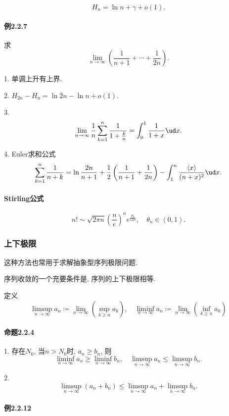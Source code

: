 $$
H_{n}=\ln n+\gamma+o(1).
$$


\paragraph{例2.2.7}

求
$$
\lim_{n\to\infty}\left(\frac{1}{n+1}+\cdots+\frac{1}{2n}\right).
$$

1. 单调上升有上界.

2. $H_{2n}-H_{n}=\ln2n-\ln n+o(1)$.

3. 
$$
\lim_{n\to\infty}\frac{1}{n}\sum_{k=1}^{n}\frac{1}{1+\frac{k}{n}}=\int_{0}^{1}\frac{1}{1+x}\ud x.
$$

4. Euler求和公式
$$
\sum_{k=1}^{n}\frac{1}{n+k}=\ln\frac{2n}{n+1}+\frac{1}{2}\left(\frac{1}{n+1}+\frac{1}{2n}\right)-\int_{1}^{n}\frac{\left\langle x\right\rangle }{(n+x)^{2}}\ud x.
$$


\paragraph{Stirling公式}

$$
n!\sim\sqrt{2\pi n}\left(\frac{n}{e}\right)^{n}e^{\frac{\theta_{n}}{12n}},\quad\theta_{n}\in\left(0,1\right).
$$


\subsubsection{上下极限}

这种方法也常用于求解抽象型序列极限问题. 

序列收敛的一个充要条件是, 序列的上下极限相等.

定义
$$
\limsup_{n\to\infty}a_{n}\coloneqq\lim_{n\to\infty}\left(\sup_{k\ge n}a_{k}\right),\quad\liminf_{n\to\infty}a_{n}\coloneqq\lim_{n\to\infty}\left(\inf_{k\ge n}a_{k}\right)
$$


\paragraph{命题2.2.4}

1. 存在$N_{0}$, 当$n>N_{0}$时, $a_{n}\ge b_{n}$, 则
$$
\liminf_{n\to\infty}a_{n}\ge\liminf_{n\to\infty}b_{n},\quad\limsup_{n\to\infty}a_{n}\le\limsup_{n\to\infty}b_{n}.
$$

2. 
$$
\limsup_{n\to\infty}\left(a_{n}+b_{n}\right)\le\limsup_{n\to\infty}a_{n}+\limsup_{n\to\infty}b_{n}.
$$


\paragraph{例2.2.12}

